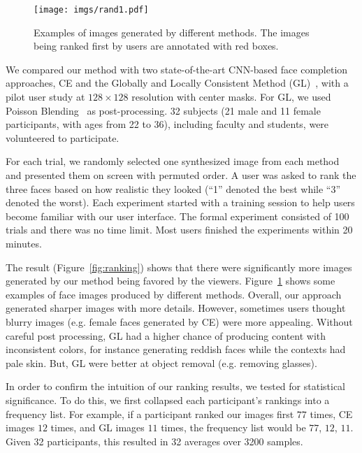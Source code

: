 \documentclass[acmtog,timestamp]{acmart}
\begin{document}
\begin{figure}
      \centering
      \begin{minipage}{0.47\textwidth}
          \centering
          \texttt{[image: imgs/rand1.pdf]} %
      \end{minipage}\hfill
	  \caption{Examples of images generated by different methods. The images being ranked first by users are annotated with red boxes.}
     \label{fig:samples}
\end{figure}%
We compared our method with two state-of-the-art CNN-based face completion approaches, CE and the Globally and Locally Consistent Method (GL)~\cite{iizuka2017globally}, with a pilot user study at $128\times128$ resolution with center masks. For GL, we used Poisson Blending~\cite{perez2003poisson} as post-processing. 32 subjects (21 male and 11 female participants, with ages from 22 to 36), including faculty and students, were volunteered to participate. 

For each trial, we randomly selected one synthesized image from each method and presented them on screen with permuted order. A user was asked to rank the three faces based on how realistic they looked (``1'' denoted the best while ``3'' denoted the worst). Each experiment started with a training session to help users become familiar with our user interface. The formal experiment consisted of 100 trials and there was no time limit. Most users finished the experiments within 20 minutes.

The result (Figure~\ref{fig:ranking}) shows that there were significantly more images generated by our method being favored by the viewers. Figure~\ref{fig:samples} shows some examples of face images produced by different methods. Overall, our approach generated sharper images with more details. However, sometimes users thought blurry images (e.g. female faces generated by CE) were more appealing. Without careful post processing, GL had a higher chance of producing content with inconsistent colors, for instance generating reddish faces while the contexts had pale skin. But, GL were better at object removal (e.g. removing glasses).

In order to confirm the intuition of our ranking results, we tested for statistical significance. To do this, we first collapsed each participant's rankings into a frequency list. For example, if a participant ranked our images first $77$ times, CE images $12$ times, and GL images $11$ times, the frequency list would be $77$, $12$, $11$. Given 32 participants, this resulted in 32 averages over 3200 samples.
\end{document}
